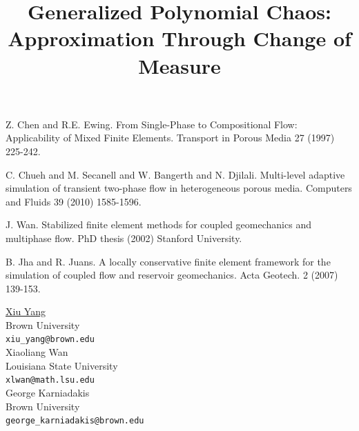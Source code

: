 \documentclass[article,A4,11pt]{llncs}%
\begin{document}

\begin{thebibliography}{10}
{\sc Z. Chen and R.E. Ewing}. {From Single-Phase to Compositional Flow: Applicability of Mixed Finite Elements}. Transport in Porous Media 27 (1997) 225-242.

{\sc C. Chueh and M. Secanell and W. Bangerth and N. Djilali}. {Multi-level adaptive simulation of transient two-phase flow in heterogeneous porous media}. Computers and Fluids 39 (2010) 1585-1596.

{\sc J. Wan}. {Stabilized finite element methods for coupled geomechanics and multiphase flow}. PhD thesis (2002) Stanford University.

{\sc B. Jha and R. Juans}. {A locally conservative finite element framework for the simulation of coupled flow and reservoir geomechanics}. Acta Geotech. 2 (2007) 139-153.
\end{thebibliography}

\title{Generalized Polynomial Chaos: Approximation Through Change of Measure}
 \author{} \institute{}
\maketitle
\begin{center}
{\large \underline{Xiu Yang}}\\
Brown University\\
{\tt xiu\_yang@brown.edu}
\\ \vspace{4mm}
{\large Xiaoliang Wan}\\
Louisiana State University\\
{\tt xlwan@math.lsu.edu}
\\ \vspace{4mm}
{\large George  Karniadakis}\\
Brown University\\
{\tt george\_karniadakis@brown.edu}
\end{center}
\end{document}

